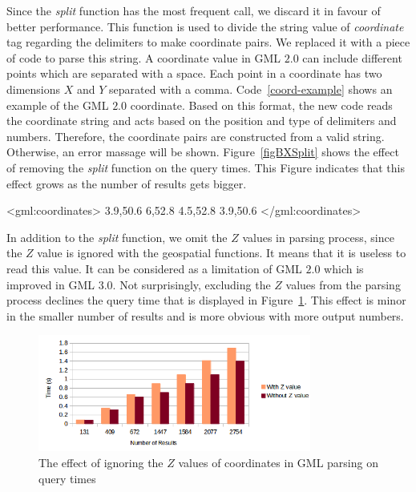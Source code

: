 \documentclass[a4paper,12pt]{article}
\begin{document}
Since the \textit{split} function has the most frequent call, we discard it in favour of better performance. This function is used to divide the string value of \textit{coordinate} tag regarding the delimiters to make coordinate pairs. We replaced it with a piece of code to parse this string. 
A coordinate value in GML $2.0$ can include different points which are separated with a space. Each point in a coordinate has two dimensions $X$ and $Y$ separated with a comma. Code~\ref{coord-example} shows an example of the GML $2.0$ coordinate. Based on this format, the new code reads the coordinate string and acts based on the position and type of delimiters and numbers. Therefore, the coordinate pairs are constructed from a valid string. Otherwise, an error massage will be shown. Figure~\ref{figBXSplit} shows the effect of removing the \textit{split} function on the query times. This Figure indicates that this effect grows as the number of results gets bigger.
 
\vspace{10px}
\begin{fakeXML}[label=coord-example,caption=An example of GML 2.0 coordinate]
<gml:coordinates>
  3.9,50.6 6,52.8 4.5,52.8 3.9,50.6
</gml:coordinates>
\end{fakeXML}
\vspace{10px}

In addition to the \textit{split} function, we omit the $Z$ values in parsing process, since the $Z$ value is ignored with the geospatial functions. It means that it is useless to read this value. It can be considered as a limitation of GML $2.0$ which is improved in GML $3.0$. Not surprisingly, excluding the $Z$ values from the parsing process declines the query time that is displayed in Figure~\ref{figBXZvalue}. This effect is minor in the smaller number of results and is more obvious with more output numbers.

\begin{figure}
\centering
\includegraphics[width=0.8\textwidth,height=0.2\textheight]{BXZvalue-sec}
\caption{The effect of ignoring the $Z$ values of coordinates in GML parsing on query times}
\label{figBXZvalue}
\end{figure}
\end{document}
